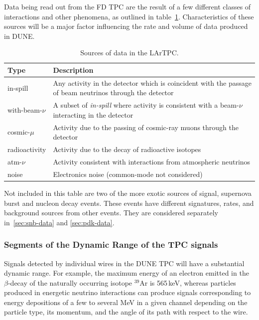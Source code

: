 Data being read out from the FD TPC are the result of a few different classes of interactions and other phenomena,
as outlined in table~\ref{tab:dune-data-sources}. Characteristics of these sources will
be a major factor influencing the rate and volume of data produced in DUNE.
\begin{table}[ht!]
	\centering
	\begin{tabular}{| p{1in} | p{4.5in} |}
		\hline
	\textbf{Type} & \textbf{Description} \\ \hline
		
	in-spill & Any activity in the detector which is coincident with
	the passage of beam neutrinos through the detector \\ \hline
	
	with-beam-$\nu$ & A subset of \textit{in-spill} where activity is
	consistent with a beam-$\nu$ interacting in the detector \\ \hline
	
	cosmic-$\mu$ & Activity due to the passing of cosmic-ray muons
	through the detector \\ \hline
	
	radioactivity & Activity due to the decay of radioactive
	isotopes \\ \hline
	
	atm-$\nu$ & Activity consistent with interactions from
	atmospheric neutrinos \\ \hline
	
	noise & Electronics noise (common-mode not considered) \\ \hline

	\end{tabular}
	\caption{Sources of data in the LArTPC.}
	\label{tab:dune-data-sources}
\end{table}

Not included in this table are two of the more exotic sources of signal, supernova burst and nucleon decay events.
These events have different signatures, rates, and background sources from other events.  
They are considered separately in~\ref{sec:snb-data} and \ref{sec:pdk-data}.  

\subsubsection{Segments of the Dynamic Range of the TPC signals}

Signals detected by individual wires in the DUNE TPC will have a substantial
dynamic range. For example, the maximum energy of an electron emitted in the $\beta$-decay of the naturally occurring isotope 
$^{39}$Ar is 565\,keV, whereas particles produced in energetic neutrino interactions can produce signals
corresponding to energy depositions of a few to several MeV in a given channel depending on the particle type, its momentum,
and the angle of its path with respect to the wire.

